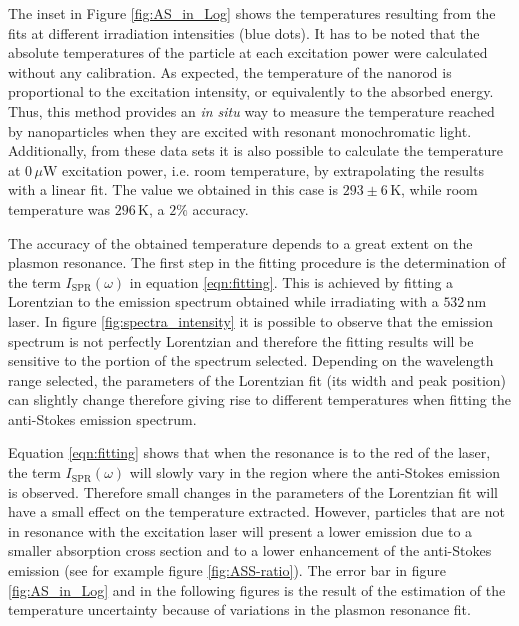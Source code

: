\documentclass[journal=nalefd,manuscript=letter]{achemso}
\newcommand{\K}{\ensuremath{\,\textrm{K}}}
\newcommand{\nm}{\ensuremath{\,\textrm{nm}}}
\newcommand{\uW}{\ensuremath{\,\mu\textrm{W}}}
\begin{document}
The inset in Figure \ref{fig:AS_in_Log} shows the temperatures resulting from
the fits at different irradiation intensities (blue dots). It has to be noted
that the absolute temperatures of the particle at each excitation power were
calculated without any calibration. As expected, the temperature of the nanorod
is proportional to the excitation intensity, or equivalently to the absorbed
energy. Thus, this method provides an \textit{in situ} way to measure the
temperature reached by nanoparticles when they are excited with resonant
monochromatic light. Additionally, from these data sets it  is also possible to
calculate the temperature at $0\uW$ excitation power, i.e. room temperature, by
extrapolating the results with a linear fit. The value we obtained in this case
is $293\pm 6 \K$, while room temperature was $296\K$, a $2\%$ accuracy.

The accuracy of the obtained temperature depends to a great extent on the
plasmon resonance. The first step in the fitting procedure is the determination
of the term $I_\textrm{SPR}(\omega)$ in equation \ref{eqn:fitting}. This is achieved by
fitting a Lorentzian to the emission spectrum obtained while irradiating with a
$532\nm$ laser. In figure \ref{fig:spectra_intensity} it is possible to observe
that the emission spectrum is not perfectly Lorentzian and therefore the fitting
results will be sensitive to the portion of the spectrum selected. Depending on
the wavelength range selected, the parameters of the Lorentzian fit (its width
and peak position) can slightly change therefore giving rise to different
temperatures when fitting the anti-Stokes emission spectrum.

Equation \ref{eqn:fitting} shows that when the resonance is to the red
of the laser, the term $I_\textrm{SPR}(\omega)$ will slowly vary in the region where the
anti-Stokes emission is observed. Therefore small changes in the parameters of
the Lorentzian fit will have a small effect on the temperature extracted.
However, particles that are not in resonance with the excitation laser will
present a lower emission due to a smaller absorption cross section and to a
lower enhancement of the anti-Stokes emission (see for example figure
\ref{fig:ASS-ratio}). 
The error bar in figure
\ref{fig:AS_in_Log} and in the following figures is the result of the estimation
of the temperature uncertainty because of variations in the plasmon resonance
fit.
\end{document}
